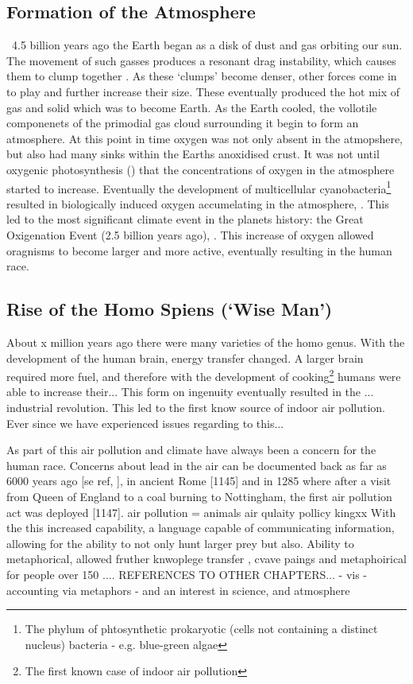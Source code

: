 \subsection{Formation of the Atmosphere}
 ~4.5 billion years ago the Earth began as a disk of dust and gas orbiting our sun. The movement of such gasses produces a resonant drag instability, which causes them to clump together \citep{drag,planet}. As these `clumps' become denser, other forces come in to play and further increase their size. These eventually produced the hot mix of gas and solid which was to become Earth.
 As the Earth cooled, the vollotile componenets of the primodial gas cloud surrounding it begin to form an atmosphere. %
At this point in time oxygen was not only absent in the atmopshere, but also had many sinks within the Earths anoxidised crust. It was not until oxygenic photosynthesis (\citep{oxygenicphotosynthesis}) that the concentrations of oxygen in the atmosphere started to increase. Eventually the development of multicellular cyanobacteria\footnote{The phylum of phtosynthetic prokaryotic (cells not containing a distinct nucleus) bacteria - e.g. blue-green algae} resulted in biologically induced oxygen accumelating in the atmosphere, \citep{multicellular}. This led to the most significant climate event in the planets history: the Great Oxigenation Event (2.5 billion years ago), \citep{oxidation}. This increase of oxygen allowed oragnisms to become larger and more active, eventually resulting in the human race.
\subsection{Rise of the Homo Spiens (`Wise Man')}
About x million years ago there were many varieties of the homo genus. With the development of the human brain, energy transfer changed. A larger brain required more fuel, and therefore with the development of cooking\footnote{The first known case of indoor air pollution} humans were able to increase their...
This form on ingenuity eventually resulted in the ... industrial revolution.
This led to the first know source of indoor air pollution.
Ever since we have experienced issues regarding to this...

As part of this air pollution and climate have always been a concern for the human race. Concerns about lead in the air can be documented back as far as 6000 years ago [se ref, ], in ancient Rome [1145] and in 1285 where after a visit from Queen of England to a coal burning to Nottingham, the first air pollution act was deployed [1147].
air pollution = animals
air qulaity pollicy
kingxx
With the this increased capability, a language capable of communicating information, allowing for the ability to not only hunt larger prey but also.
Ability to metaphorical, allowed fruther knwoplege transfer , cvave paings and metaphoirical for people over 150 ....
REFERENCES TO OTHER CHAPTERS...
- vis
- accounting via metaphors
- and an interest in science, and atmosphere




